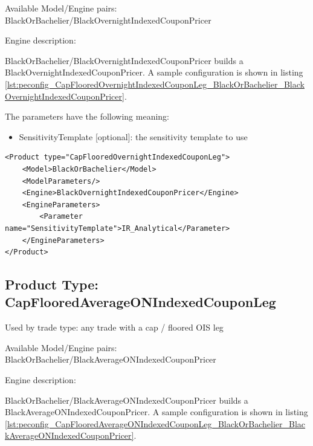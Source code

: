 Available Model/Engine pairs: BlackOrBachelier/BlackOvernightIndexedCouponPricer

Engine description:

BlackOrBachelier/BlackOvernightIndexedCouponPricer builds a BlackOvernightIndexedCouponPricer. A sample configuration is
shown in listing \ref{lst:peconfig_CapFlooredOvernightIndexedCouponLeg_BlackOrBachelier_BlackOvernightIndexedCouponPricer}.

The parameters have the following meaning:

\begin{itemize}
\item SensitivityTemplate [optional]: the sensitivity template to use
\end{itemize}

\begin{longlisting}
\begin{verbatim}
<Product type="CapFlooredOvernightIndexedCouponLeg">
    <Model>BlackOrBachelier</Model>
    <ModelParameters/>
    <Engine>BlackOvernightIndexedCouponPricer</Engine>
    <EngineParameters>
        <Parameter name="SensitivityTemplate">IR_Analytical</Parameter>
    </EngineParameters>
</Product>
\end{verbatim}
\caption{Configuration for Product CapFlooredOvernightIndexedCouponLeg, Model BlackOrBachelier, Engine BlackOvernightIndexedCouponPricer}
\label{lst:peconfig_CapFlooredOvernightIndexedCouponLeg_BlackOrBachelier_BlackOvernightIndexedCouponPricer}
\end{longlisting}

\subsection{Product Type: CapFlooredAverageONIndexedCouponLeg}

Used by trade type: any trade with a cap / floored OIS leg

Available Model/Engine pairs: BlackOrBachelier/BlackAverageONIndexedCouponPricer

Engine description:

BlackOrBachelier/BlackAverageONIndexedCouponPricer builds a BlackAverageONIndexedCouponPricer. A sample configuration is
shown in listing \ref{lst:peconfig_CapFlooredAverageONIndexedCouponLeg_BlackOrBachelier_BlackAverageONIndexedCouponPricer}.

